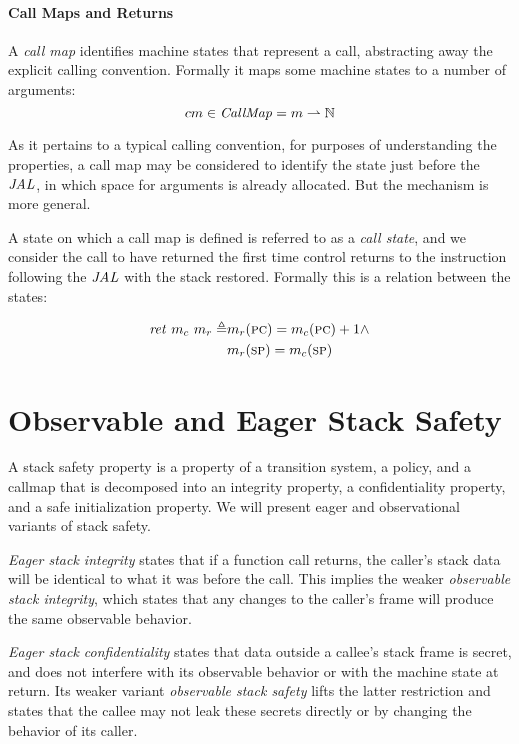 \documentclass[conference]{IEEEtran}
\begin{document}
  \paragraph{Call Maps and Returns}

    A {\it call map} identifies machine states that represent a call, abstracting away the explicit
    calling convention. Formally it maps some machine states to a number of arguments:
    \[cm \in \mathit{CallMap} = m \rightharpoonup \mathbb{N}\]

    As it pertains to a typical calling convention, for purposes of understanding the properties,
    a call map may be considered to identify the state just before the \(\mathit{JAL}\), in which space for
    arguments is already allocated. But the mechanism is more general.

    A state on which a call map is defined is referred to as a {\it call state}, and we consider
    the call to have returned the first time control returns to the instruction following the
    \(\mathit{JAL}\) with the stack restored. Formally this is a relation between the states:
    
    \[\begin{split}
      \mathit{ret}\ m_c\ m_r \triangleq & m_r(\textsc{pc}) = m_c(\textsc{pc})+1 \land \\
                                        & m_r(\textsc{sp}) = m_c(\textsc{sp})
    \end{split}\]

  \section{Observable and Eager Stack Safety}

    A stack safety property is a property of a transition system, a policy, and a callmap
    that is decomposed into an integrity property, a confidentiality property, and a safe
    initialization property. We will present eager and observational variants of stack safety.

    {\it Eager stack integrity} states that if a function call returns, the caller's stack data
    will be identical to what it was before the call. This implies the weaker {\it observable
    stack integrity}, which states that any changes to the caller's frame will produce the same
    observable behavior.

    {\it Eager stack confidentiality} states that data outside a callee's stack frame is secret,
    and does not interfere with its observable behavior or with the machine state at return. Its
    weaker variant {\it observable stack safety} lifts the latter restriction and states that
    the callee may not leak these secrets directly or by changing the behavior of its caller.
\end{document}
